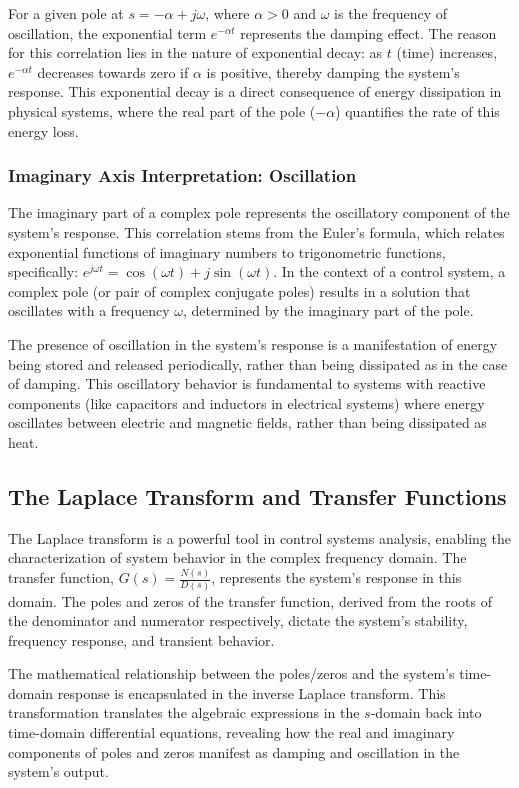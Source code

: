 \documentclass[12pt]{article}
\begin{document}
For a given pole at \(s = -\alpha + j\omega\), where \(\alpha > 0\) and \(\omega\) is the frequency of oscillation, the exponential term \(e^{-\alpha t}\) represents the damping effect. The reason for this correlation lies in the nature of exponential decay: as \(t\) (time) increases, \(e^{-\alpha t}\) decreases towards zero if \(\alpha\) is positive, thereby damping the system's response. This exponential decay is a direct consequence of energy dissipation in physical systems, where the real part of the pole (\(-\alpha\)) quantifies the rate of this energy loss.

\subsubsection{Imaginary Axis Interpretation: Oscillation}
The imaginary part of a complex pole represents the oscillatory component of the system's response. This correlation stems from the Euler's formula, which relates exponential functions of imaginary numbers to trigonometric functions, specifically: \(e^{j\omega t} = \cos(\omega t) + j\sin(\omega t)\). In the context of a control system, a complex pole (or pair of complex conjugate poles) results in a solution that oscillates with a frequency \(\omega\), determined by the imaginary part of the pole.

The presence of oscillation in the system's response is a manifestation of energy being stored and released periodically, rather than being dissipated as in the case of damping. This oscillatory behavior is fundamental to systems with reactive components (like capacitors and inductors in electrical systems) where energy oscillates between electric and magnetic fields, rather than being dissipated as heat.

\subsection{The Laplace Transform and Transfer Functions}
The Laplace transform is a powerful tool in control systems analysis, enabling the characterization of system behavior in the complex frequency domain. The transfer function, \(G(s) = \frac{N(s)}{D(s)}\), represents the system's response in this domain. The poles and zeros of the transfer function, derived from the roots of the denominator and numerator respectively, dictate the system's stability, frequency response, and transient behavior.

The mathematical relationship between the poles/zeros and the system's time-domain response is encapsulated in the inverse Laplace transform. This transformation translates the algebraic expressions in the \(s\)-domain back into time-domain differential equations, revealing how the real and imaginary components of poles and zeros manifest as damping and oscillation in the system's output.
\end{document}
